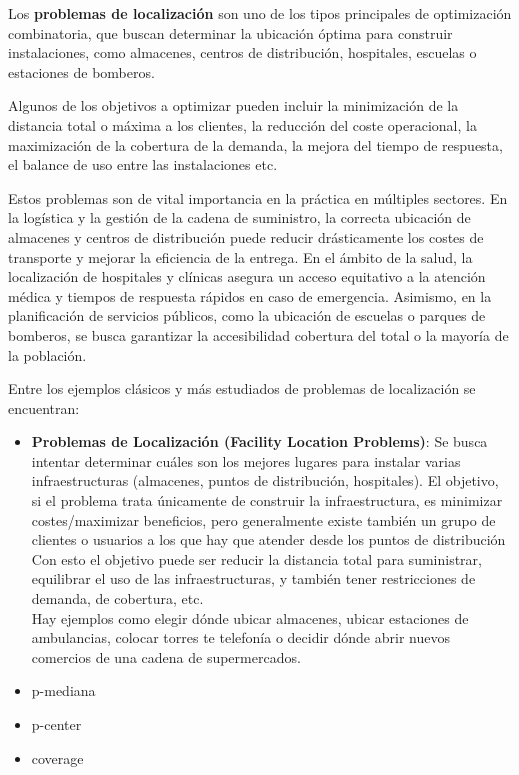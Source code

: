 \documentclass[12pt,a4paper]{book}
\begin{document}
Los \textbf{problemas de localización} son uno de los tipos principales de optimización combinatoria, que buscan determinar la ubicación óptima para construir instalaciones, como almacenes, centros de distribución, hospitales, escuelas o estaciones de bomberos. 

Algunos de los objetivos a optimizar pueden incluir la minimización de la distancia total o máxima a los clientes, la reducción del coste operacional, la maximización de la cobertura de la demanda, la mejora del tiempo de respuesta, el balance de uso entre las instalaciones etc.

Estos problemas son de vital importancia en la práctica en múltiples sectores. En la logística y la gestión de la cadena de suministro, la correcta ubicación de almacenes y centros de distribución puede reducir drásticamente los costes de transporte y mejorar la eficiencia de la entrega. En el ámbito de la salud, la localización de hospitales y clínicas asegura un acceso equitativo a la atención médica y tiempos de respuesta rápidos en caso de emergencia. Asimismo, en la planificación de servicios públicos, como la ubicación de escuelas o parques de bomberos, se busca garantizar la accesibilidad cobertura del total o la mayoría de la población.

Entre los ejemplos clásicos y más estudiados de problemas de localización se encuentran:

\begin{itemize}
    \item \textbf{Problemas de Localización (Facility Location Problems)}: Se busca intentar determinar cuáles son los mejores lugares para instalar varias infraestructuras (almacenes, puntos de distribución, hospitales). El objetivo, si el problema trata únicamente de construir la infraestructura, es minimizar costes/maximizar beneficios, pero generalmente existe también un grupo de clientes o usuarios a los que hay que atender desde los puntos de distribución Con esto el objetivo puede ser reducir la distancia total para suministrar, equilibrar
el uso de las infraestructuras, y también tener restricciones de demanda, de cobertura, etc.\\
Hay ejemplos como elegir dónde ubicar almacenes, ubicar estaciones de ambulancias, colocar torres te telefonía o decidir dónde abrir nuevos comercios de una cadena de supermercados.
    \item p-mediana
    \item p-center
    \item coverage
\end{itemize}
\end{document}
